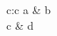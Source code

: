 \documentclass{article}
\begin{document}
\begin{tabular}{c:c}
a & b\\
c & d
\end{tabular}
\end{document}
